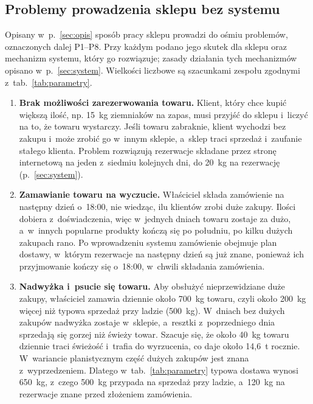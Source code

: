 \documentclass[12pt,a4paper,oneside]{article}
\newcounter{pu}
\begin{document}
\subsection{Problemy prowadzenia sklepu bez systemu}
\label{sec:problemy}

Opisany w~p.~\ref{sec:opis} sposób pracy sklepu prowadzi do ośmiu problemów, oznaczonych dalej P1--P8. Przy każdym podano jego skutek dla sklepu oraz mechanizm systemu, który go rozwiązuje; zasady działania tych mechanizmów opisano w~p.~\ref{sec:system}. Wielkości liczbowe są szacunkami zespołu zgodnymi z~tab.~\ref{tab:parametry}.

\begin{enumerate}[label=\textbf{P\arabic*.},ref=P\arabic*,leftmargin=1.2cm]
	\item \label{prob:rezerwacja}
	\textbf{Brak możliwości zarezerwowania towaru.} Klient, który chce kupić większą ilość, np. 15~kg ziemniaków na zapas, musi przyjść do sklepu i~liczyć na to, że towaru wystarczy. Jeśli towaru zabraknie, klient wychodzi bez zakupu i~może zrobić go w~innym sklepie, a~sklep traci sprzedaż i~zaufanie stałego klienta. Problem rozwiązują rezerwacje składane przez stronę internetową na jeden z~siedmiu kolejnych dni, do 20~kg na rezerwację (p.~\ref{sec:system}).

	\item \label{prob:zamawianie}
	\textbf{Zamawianie towaru na wyczucie.} Właściciel składa zamówienie na następny dzień o~18:00, nie wiedząc, ilu klientów zrobi duże zakupy. Ilości dobiera z~doświadczenia, więc w~jednych dniach towaru zostaje za dużo, a~w~innych popularne produkty kończą się po południu, po kilku dużych zakupach rano. Po wprowadzeniu systemu zamówienie obejmuje plan dostawy, w~którym rezerwacje na następny dzień są już znane, ponieważ ich przyjmowanie kończy się o~18:00, w~chwili składania zamówienia.

	\item \label{prob:straty}
	\textbf{Nadwyżka i~psucie się towaru.} Aby obsłużyć nieprzewidziane duże zakupy, właściciel zamawia dziennie około 700~kg towaru, czyli około 200~kg więcej niż typowa sprzedaż przy ladzie (500~kg). W~dniach bez dużych zakupów nadwyżka zostaje w~sklepie, a~resztki z~poprzedniego dnia sprzedają się gorzej niż świeży towar. Szacuje się, że około 40~kg towaru dziennie traci świeżość i~trafia do wyrzucenia, co daje około 14,6~t rocznie. W~wariancie planistycznym część dużych zakupów jest znana z~wyprzedzeniem. Dlatego w~tab.~\ref{tab:parametry} typowa dostawa wynosi 650~kg, z~czego 500~kg przypada na sprzedaż przy ladzie, a~120~kg na rezerwacje znane przed złożeniem zamówienia.


\end{enumerate}
\end{document}
